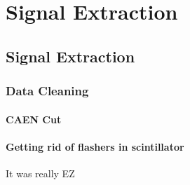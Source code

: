 
\chapter{Signal Extraction}

\ifpdf
    \graphicspath{{sigex/figures/PNG/}{sigex/figures/PDF/}{sigex/figures/}}
\else
    \graphicspath{{sigex/figures/EPS/}{sigex/figures/}}
\fi


\section{Signal Extraction}
\subsection{Data Cleaning}
\subsubsection{CAEN Cut}
\subsubsection{Getting rid of  flashers in scintillator}
It was really EZ

